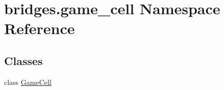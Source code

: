 \hypertarget{namespacebridges_1_1game__cell}{}\section{bridges.\+game\+\_\+cell Namespace Reference}
\label{namespacebridges_1_1game__cell}
\subsection*{Classes}
\begin{DoxyCompactItemize}
\item 
class \mbox{\hyperlink{classbridges_1_1game__cell_1_1_game_cell}{Game\+Cell}}
\end{DoxyCompactItemize}
